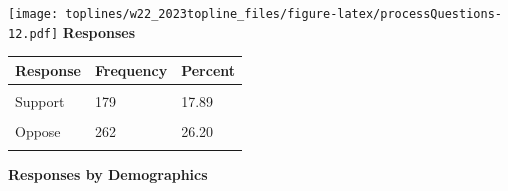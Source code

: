 \documentclass[]{article}
\begin{document}
\texttt{[image: toplines/w22\_2023topline\_files/figure-latex/processQuestions-12.pdf]}
\textbf{Responses}

\begin{tabu} to 
\toprule
Response & Frequency & Percent\\
\midrule
{} &  & \\
Support & 179 & 17.89\\
 &  & \\
Oppose & 262 & 26.20\\
 &  & \\
\bottomrule
\end{tabu}

\textbf{Responses by Demographics}\begingroup\fontsize{7}{9}\selectfont
\end{document}
